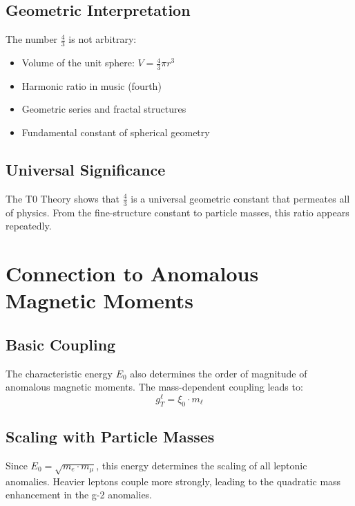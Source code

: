 \documentclass[12pt,a4paper]{article}
\newcommand{\xipar}{\xi_0}
\newcommand{\Ezero}{E_0}
\begin{document}
	\subsection{Geometric Interpretation}
	
	The number $\frac{4}{3}$ is not arbitrary:
	\begin{itemize}
		\item Volume of the unit sphere: $V = \frac{4}{3}\pi r^3$
		\item Harmonic ratio in music (fourth)
		\item Geometric series and fractal structures
		\item Fundamental constant of spherical geometry
	\end{itemize}
	
	\subsection{Universal Significance}
	
	The T0 Theory shows that $\frac{4}{3}$ is a universal geometric constant that permeates all of physics. From the fine-structure constant to particle masses, this ratio appears repeatedly.
	
	\section{Connection to Anomalous Magnetic Moments}
	
	\subsection{Basic Coupling}
	
	The characteristic energy $\Ezero$ also determines the order of magnitude of anomalous magnetic moments. The mass-dependent coupling leads to:
	\begin{equation}
		g_T^\ell = \xipar \cdot m_\ell
		\label{eq:coupling_g2}
	\end{equation}
	
	\subsection{Scaling with Particle Masses}
	
	Since $\Ezero = \sqrt{m_e \cdot m_\mu}$, this energy determines the scaling of all leptonic anomalies. Heavier leptons couple more strongly, leading to the quadratic mass enhancement in the g-2 anomalies.
	
\end{document}
